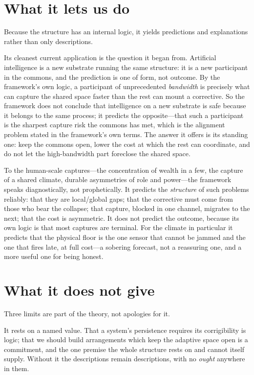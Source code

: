 \documentclass[11pt]{article}
\begin{document}
\section*{What it lets us do}

Because the structure has an internal logic, it yields predictions and explanations rather than only descriptions.

Its cleanest current application is the question it began from. Artificial intelligence is a new substrate running the same structure: it is a new participant in the commons, and the prediction is one of form, not outcome. By the framework's own logic, a participant of unprecedented \emph{bandwidth} is precisely what can capture the shared space faster than the rest can mount a corrective. So the framework does not conclude that intelligence on a new substrate is safe because it belongs to the same process; it predicts the opposite---that such a participant is the sharpest capture risk the commons has met, which is the alignment problem stated in the framework's own terms. The answer it offers is its standing one: keep the commons open, lower the cost at which the rest can coordinate, and do not let the high-bandwidth part foreclose the shared space.

To the human-scale captures---the concentration of wealth in a few, the capture of a shared climate, durable asymmetries of role and power---the framework speaks diagnostically, not prophetically. It predicts the \emph{structure} of such problems reliably: that they are local/global gaps; that the corrective must come from those who bear the collapse; that capture, blocked in one channel, migrates to the next; that the cost is asymmetric. It does not predict the outcome, because its own logic is that most captures are terminal. For the climate in particular it predicts that the physical floor is the one sensor that cannot be jammed and the one that fires late, at full cost---a sobering forecast, not a reassuring one, and a more useful one for being honest.

\section*{What it does not give}

Three limits are part of the theory, not apologies for it.

It rests on a named value. That a system's persistence requires its corrigibility is logic; that we should build arrangements which keep the adaptive space open is a commitment, and the one premise the whole structure rests on and cannot itself supply. Without it the descriptions remain descriptions, with no \emph{ought} anywhere in them.
\end{document}
